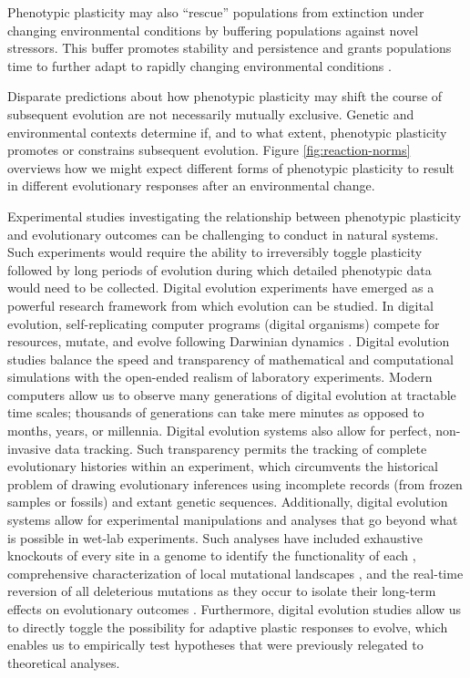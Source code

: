 Phenotypic plasticity may also ``rescue'' populations from extinction under changing environmental conditions by buffering populations against novel stressors.
This buffer promotes stability and persistence and grants populations time to further adapt to rapidly changing environmental conditions \citep{west-eberhard_developmental_2003,chevin_when_2010}. 

Disparate predictions about how phenotypic plasticity may shift the course of subsequent evolution are not necessarily mutually exclusive.
Genetic and environmental contexts determine if, and to what extent, phenotypic plasticity promotes or constrains subsequent evolution.
Figure \ref{fig:reaction-norms} overviews how we might expect different forms of phenotypic plasticity to result in different evolutionary responses after an environmental change.

Experimental studies investigating the relationship between phenotypic plasticity and evolutionary outcomes can be challenging to conduct in natural systems.
Such experiments would require the ability to irreversibly toggle plasticity followed by long periods of evolution during which detailed phenotypic data would need to be collected.
Digital evolution experiments have emerged as a powerful research framework from which evolution can be studied.
In digital evolution, self-replicating computer programs (digital organisms) compete for resources, mutate, and evolve following Darwinian dynamics  \citep{wilke_biology_2002}.
Digital evolution studies balance the speed and transparency of mathematical and computational simulations with the open-ended realism of laboratory experiments.
Modern computers allow us to observe many generations of digital evolution at tractable time scales; thousands of generations can take mere minutes as opposed to months, years, or millennia.
Digital evolution systems also allow for perfect, non-invasive data tracking.
Such transparency permits the tracking of complete evolutionary histories within an experiment, which circumvents the historical problem of drawing evolutionary inferences using incomplete records (from frozen samples or fossils) and extant genetic sequences.
Additionally, digital evolution systems allow for experimental manipulations and analyses that go beyond what is possible in wet-lab experiments.
Such analyses have included exhaustive knockouts of every site in a genome to identify the functionality of each \citep{lenski_evolutionary_2003},
comprehensive characterization of local mutational landscapes \citep{lenski_genome_1999,canino-koning_fluctuating_2019},
and the real-time reversion of all deleterious mutations as they occur to isolate their long-term effects on evolutionary outcomes \citep{covert_experiments_2013}. 
Furthermore, digital evolution studies allow us to directly toggle the possibility for adaptive plastic responses to evolve, which enables us to empirically test hypotheses that were previously relegated to theoretical analyses.


